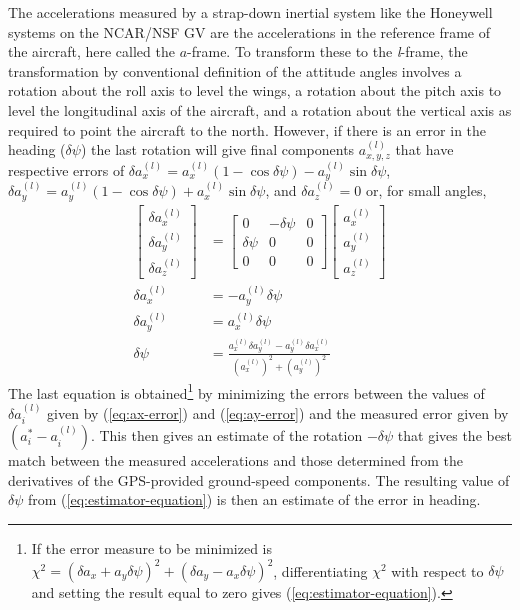 \documentclass[english,british,amt,bookmarks=false,unicode=true]{copernicus}\usepackage[]{graphicx}\usepackage[]{color}
\begin{document}
The accelerations measured by a strap-down inertial system like the
Honeywell systems on the NCAR/NSF GV are the accelerations in the
reference frame of the aircraft, here called the $a$-frame. To transform
these to the \emph{l}-frame, the transformation by conventional definition
of the attitude angles involves a rotation about the roll axis to
level the wings, a rotation about the pitch axis to level the longitudinal
axis of the aircraft, and a rotation about the vertical axis as required
to point the aircraft to the north. However, if there is an error
in the heading ($\delta\psi$) the last rotation will give final components
$a_{x,y,z}^{(l)}$ that have respective errors of $\delta a_{x}^{(l)}=a_{x}^{(l)}(1-\cos\delta\psi)-a_{y}^{(l)}\sin\delta\psi$,
$\delta a_{y}^{(l)}=a_{y}^{(l)}(1-\cos\delta\psi)+a_{x}^{(l)}\sin\delta\psi$,
and $\delta a_{z}^{(l)}=0$ or, for small angles,\\
\begin{align}
\left[\begin{array}{c}
\delta a_{x}^{(l)}\\
\delta a_{y}^{(l)}\\
\delta a_{z}^{(l)}
\end{array}\right] & =\left[\begin{array}{ccc}
0 & -\delta\psi & 0\\
\delta\psi & 0 & 0\\
0 & 0 & 0
\end{array}\right]\left[\begin{array}{c}
a_{x}^{(l)}\\
a_{y}^{(l)}\\
a_{z}^{(l)}
\end{array}\right]\label{eq:heading-error-equation}\\
\delta a_{x}^{(l)} & =-a_{y}^{(l)}\delta\psi\label{eq:ax-error}\\
\delta a_{y}^{(l)} & =a_{x}^{(l)}\delta\psi\label{eq:ay-error}\\
\delta\psi & =\frac{a_{x}^{(l)}\delta a_{y}^{(l)}-a_{y}^{(l)}\delta a_{x}^{(l)}}{(a_{x}^{(l)})^{2}+(a_{y}^{(l)})^{2}}\label{eq:estimator-equation}
\end{align}
The last equation is obtained\footnote{If the error measure to be minimized is $\chi^{2}=(\delta a_{x}+a_{y}\delta\psi)^{2}+(\delta a_{y}-a_{x}\delta\psi)^{2}$,
differentiating $\chi^{2}$ with respect to $\delta\psi$ and setting
the result equal to zero gives (\ref{eq:estimator-equation}).} by minimizing the errors between the values of $\delta a_{i}^{(l)}$
given by (\ref{eq:ax-error}) and (\ref{eq:ay-error}) and the measured
error given by $(a_{i}^{*}-a_{i}^{(l)})$. This then gives an estimate
of the rotation $-\delta\psi$ that gives the best match between the
measured accelerations and those determined from the derivatives of
the GPS-provided ground-speed components. The resulting value of $\delta\psi$
from (\ref{eq:estimator-equation}) is then an estimate of the error
in heading.
\end{document}
